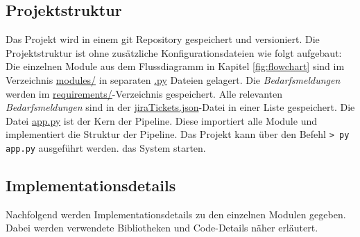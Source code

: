 \subsection{Projektstruktur}
\label{sec:projektstruktur}
Das Projekt wird in einem git Repository gespeichert und versioniert. Die Projektstruktur ist ohne zusätzliche Konfigurationsdateien wie folgt aufgebaut:
Die einzelnen Module aus dem Flussdiagramm in Kapitel \ref{fig:flowchart} sind im Verzeichnis \url{modules/} in separaten \url{.py} Dateien gelagert. Die \emph{Bedarfsmeldungen} werden im \url{requirements/}-Verzeichnis gespeichert. Alle relevanten \emph{Bedarfsmeldungen} sind in der \url{jiraTickets.json}-Datei in einer Liste gespeichert. Die Datei \url{app.py} ist der Kern der Pipeline. Diese importiert alle Module und implementiert die Struktur der Pipeline. Das Projekt kann über den Befehl \lstinline{> py app.py} ausgeführt werden.
 das System starten.
\subsection{Implementationsdetails}
Nachfolgend werden Implementationsdetails zu den einzelnen Modulen gegeben. Dabei werden verwendete Bibliotheken und Code-Details näher erläutert.
